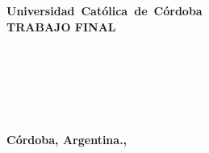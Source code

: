 
\sloppy
\thispagestyle{empty}
\begin{center}
{\bf \mbox{Universidad Cat\'olica de C\'ordoba}}\\

{\bf TRABAJO FINAL} \\
{\bf \THESISSINODALA} \\

\begin{large}{\bf \THESISNAMEA}\end{large} \\
\end{center}
{\bf \THESISAUTHORA} \\
{\bf \THESISAUTHORB} \\


\begin{center}
{\bf C\'ordoba, Argentina., \THESISDATE}
\end{center}

